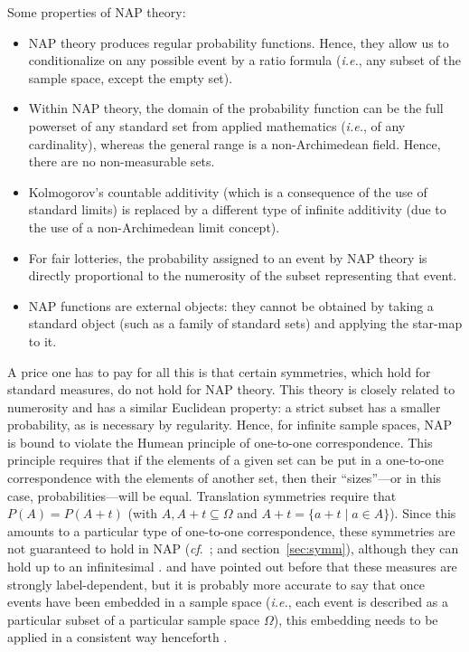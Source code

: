 Some properties of NAP theory:
\begin{itemize}
  \item NAP theory produces regular probability functions. Hence, they allow us to conditionalize on any possible event by a ratio formula (\textit{i.e.}, any subset of the sample space, except the empty set).
  \item Within NAP theory, the domain of the probability function can be the full powerset of any standard set from applied mathematics (\textit{i.e.}, of any cardinality), whereas the general range is a non-Archimedean field. Hence, there are no non-measurable sets.
  \item Kolmogorov's countable additivity (which is a consequence of the use of standard limits) is replaced by a different type of infinite additivity (due to the use of a non-Archimedean limit concept).
  \item For fair lotteries, the probability assigned to an event by NAP theory is directly proportional to the numerosity of the subset representing that event.
  \item NAP functions are external objects: they cannot be obtained by taking a standard object (such as a family of standard sets) and applying the star-map to it.
\end{itemize}

A price one has to pay for all this is that certain symmetries, which hold for standard measures, do not hold for NAP theory. This theory is closely related to numerosity and has a similar Euclidean property: a strict subset has a smaller probability, as is necessary by regularity. Hence, for infinite sample spaces, NAP is bound to violate the Humean principle of one-to-one correspondence. This principle requires that if the elements of a given set can be put in a one-to-one
correspondence with the elements of another set, then their ``sizes''---or in this case, probabilities---will be equal. Translation symmetries require that $P(A)=P(A+t)$ (with $A, A+t \subseteq \Omega$ and $A+t=\{a+t \mid a\in A\}$). Since this amounts to a particular type of one-to-one correspondence, these symmetries are not guaranteed to hold in NAP (\textit{cf}.\ \citealt{Williamson:2007,Parker:2013}; and section~\ref{sec:symm}), although they can hold up to an infinitesimal \citep{BernsteinWattenberg:1969}. \citet{Bartha:2004} and \citet{Weintraub:2008} have pointed out before that these measures are strongly label-dependent, but it is probably more accurate to say that once events have been embedded in a sample space (\textit{i.e.}, each event is described as a particular subset of a particular sample space $\Omega$), this embedding needs to be applied in a consistent way henceforth \citep{Hofweber:2014,Benci_etal:2018}.

